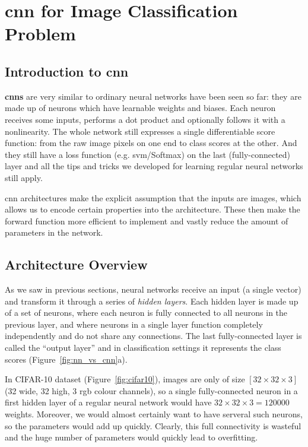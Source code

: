 \section{\acrlong{cnn} for Image Classification Problem}
\subsection{Introduction to \acrlong{cnn}}
\textbf{\glspl{cnn}} are very similar to ordinary neural networks have been
seen so far: they are made up of neurons which have learnable weights and
biases. Each neuron receives some inputs, performs a dot product and optionally
follows it with a nonlinearity. The whole network still expresses a single
differentiable score function: from the raw image pixels on one end to class
scores at the other. And they still have a loss function (e.g.
\acrshort{svm}/Softmax) on the last (fully-connected) layer and all the tips
and tricks we developed for learning regular neural networks still apply.


\acrshort{cnn} architectures make the explicit assumption that the inputs are
images, which allows us to encode certain properties into the architecture.
These then make the forward function more efficient to implement and vastly
reduce the amount of parameters in the network.

\subsection{Architecture Overview}
As we saw in previous sections, neural networks receive an input (a single
vector) and transform it through a series of \emph{hidden layers}. Each hidden
layer is made up of a set of neurons, where each neuron is fully connected to
all neurons in the previous layer, and where neurons in a single layer function
completely independently and do not share any connections. The last
fully-connected layer is called the ``output layer'' and in classification
settings it represents the class scores (Figure~\ref{fig:nn_vs_cnn}a).


In CIFAR-10 dataset (Figure~\ref{fig:cifar10}), images are only of
size $[32\times32\times3]$ (32 wide, 32 high, 3 \acrshort{rgb} colour channels),
so a single fully-connected neuron in a first hidden layer of a regular neural
network would have $32\times32\times3=120000$ weights. Moreover, we would
almost certainly want to have serveral such neurons, so the parameters would
add up quickly. Clearly, this full connectivity is wasteful and the huge number
of parameters would quickly lead to overfitting.


